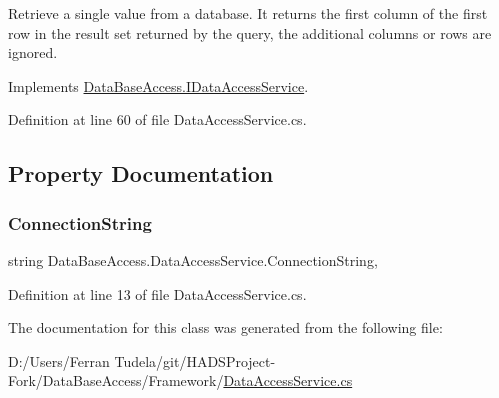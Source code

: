 Retrieve a single value from a database. It returns the first column of the first row in the result set returned by the query, the additional columns or rows are ignored. 



Implements \mbox{\hyperlink{interfaceDataBaseAccess_1_1IDataAccessService_a0788e764e3f4418039d73291b8c7e87c}{Data\+Base\+Access.\+I\+Data\+Access\+Service}}.



Definition at line 60 of file Data\+Access\+Service.\+cs.



\subsection{Property Documentation}
\mbox{\label{classDataBaseAccess_1_1DataAccessService_a68fdde0329f29760ea79961cb70da656}} 
\subsubsection{\texorpdfstring{ConnectionString}{ConnectionString}}
{\footnotesize\ttfamily string Data\+Base\+Access.\+Data\+Access\+Service.\+Connection\+String\hspace{0.3cm}{\ttfamily [get]}, {}}







Definition at line 13 of file Data\+Access\+Service.\+cs.



The documentation for this class was generated from the following file\+:\begin{DoxyCompactItemize}
\item 
D\+:/\+Users/\+Ferran Tudela/git/\+H\+A\+D\+S\+Project-\/\+Fork/\+Data\+Base\+Access/\+Framework/\mbox{\hyperlink{DataAccessService_8cs}{Data\+Access\+Service.\+cs}}\end{DoxyCompactItemize}
